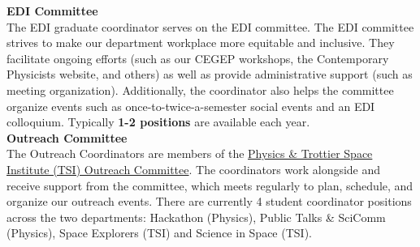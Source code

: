 \noindent \textbf{\sffamily EDI Committee}\\
The EDI graduate coordinator serves on the EDI committee. The EDI committee strives to make our department workplace more equitable and inclusive. They facilitate ongoing efforts (such as our CEGEP workshops, the Contemporary Physicists website, and others) as well as provide administrative support (such as meeting organization). Additionally, the coordinator also helps the committee organize events such as once-to-twice-a-semester social events and an EDI colloquium. Typically \textbf{1-2 positions} are available each year. \\

\noindent \textbf{\sffamily Outreach Committee}\\
The Outreach Coordinators are members of the \href{https://physics-tsi-outreach.physics.mcgill.ca}{Physics \& Trottier Space Institute (TSI) Outreach Committee}. The coordinators work alongside and receive support from the committee, which meets regularly to plan, schedule, and organize our outreach events. There are currently 4 student coordinator positions across the two departments: Hackathon (Physics), Public Talks \& SciComm (Physics), Space Explorers (TSI) and Science in Space (TSI). \\

